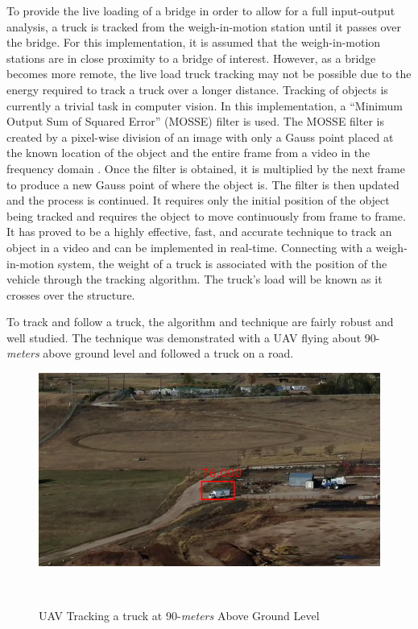 \documentclass{sigchi}
\begin{document}
To provide the live loading of a bridge in order to allow for a full input-output analysis, a truck is tracked from the weigh-in-motion station until it passes over the bridge. For this implementation, it is assumed that the weigh-in-motion stations are in close proximity to a bridge of interest. However, as a bridge becomes more remote, the live load truck tracking may not be possible due to the energy required to track a truck over a longer distance. Tracking of objects is currently a trivial task in computer vision. In this implementation, a ``Minimum Output Sum of Squared Error'' (MOSSE) filter is used. The MOSSE filter is created by a pixel-wise division of an image with only a Gauss point placed at the known location of the object and the entire frame from a video in the frequency domain \cite{Bolme2010VisualFilters}. Once the filter is obtained, it is multiplied by the next frame to produce a new Gauss point of where the object is. The filter is then updated and the process is continued. It requires only the initial position of the object being tracked and requires the object to move continuously from frame to frame. It has proved to be a highly effective, fast, and accurate technique to track an object in a video and can be implemented in real-time. Connecting with a weigh-in-motion system, the weight of a truck is associated with the position of the vehicle through the tracking algorithm. The truck's load will be known as it crosses over the structure. 

To track and follow a truck, the algorithm and technique are fairly robust and well studied. The technique was demonstrated with a UAV flying about 90-\textit{meters} above ground level and followed a truck on a road.

\begin{figure}[ht]
    \centering
    \includegraphics[width=0.9\columnwidth]{Figures/truck_tracking.png}
    \caption{UAV Tracking a truck at  90-\textit{meters} Above Ground Level}~\label{fig:truck}
\end{figure}
\end{document}
